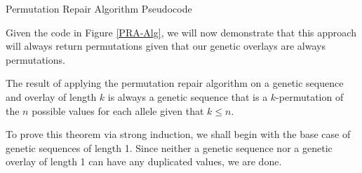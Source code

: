 %
%
\begin{algorithm}
	\SetAlgoLined
	       
	\BlankLine

	
	\BlankLine

	\caption{Permutation Repair Algorithm Pseudocode}
	\label{PRA-Alg}
\end{algorithm}

Given the code in Figure \ref{PRA-Alg}, we will now demonstrate that this approach will always return permutations given that our genetic overlays are always permutations.

\begin{thm}
The result of applying the permutation repair algorithm on a genetic sequence and overlay of length $k$ is always a genetic sequence that is a $k$-permutation of the $n$ possible values for each allele given that $ k \leq n$.
\end{thm}

To prove this theorem via strong induction, we shall begin with the base case of genetic sequences of length 1. Since neither a genetic sequence nor a genetic overlay of length 1 can have any duplicated values, we are done. 

